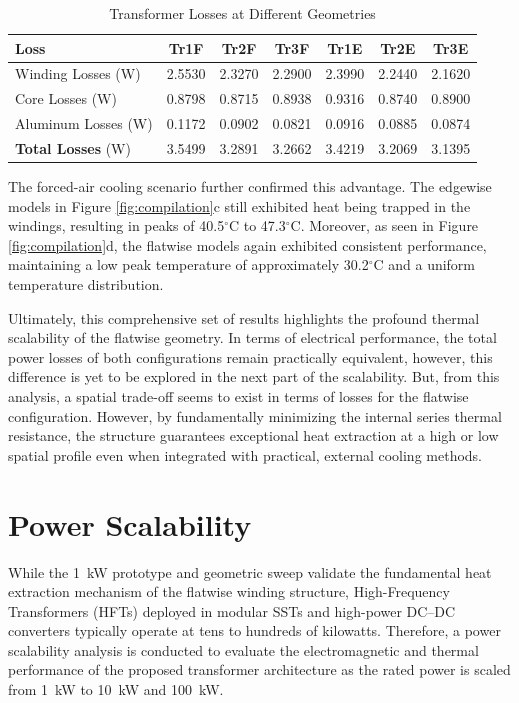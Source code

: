 \begin{table}[h!]
\centering
\caption{Transformer Losses at Different Geometries}
\label{tab:transformer_losses}
\begin{tabular}{lcccccc}
\hline
\hline
\textbf{Loss} & \textbf{Tr1F} & \textbf{Tr2F} & \textbf{Tr3F} & \textbf{Tr1E} & \textbf{Tr2E} & \textbf{Tr3E} \\
\hline
Winding Losses (W)  & 2.5530 & 2.3270 & 2.2900 & 2.3990 & 2.2440 & 2.1620 \\
Core Losses (W)     & 0.8798 & 0.8715 & 0.8938 & 0.9316 & 0.8740 & 0.8900 \\
Aluminum Losses (W) & 0.1172 & 0.0902 & 0.0821 & 0.0916 & 0.0885 & 0.0874 \\
\hline
\textbf{Total Losses} (W)    & 3.5499 & 3.2891 & 3.2662 & 3.4219 & 3.2069 & 3.1395 \\
\hline
\hline
\end{tabular} 
\end{table}

The forced-air cooling scenario further confirmed this advantage. The edgewise models in Figure \ref{fig:compilation}c still exhibited heat being trapped in the windings, resulting in peaks of 40.5$^\circ$C to 47.3$^\circ$C. Moreover, as seen in Figure \ref{fig:compilation}d, the flatwise models again exhibited consistent performance, maintaining a low peak temperature of approximately 30.2$^\circ$C and a uniform temperature distribution. 

Ultimately, this comprehensive set of results highlights the profound thermal scalability of the flatwise geometry. In terms of electrical performance, the total power losses of both configurations remain practically equivalent, however, this difference is yet to be explored in the next part of the scalability. But, from this analysis, a spatial trade-off seems to exist in terms of losses for the flatwise configuration. However, by fundamentally minimizing the internal series thermal resistance, the structure guarantees exceptional heat extraction at a high or low spatial profile even when integrated with practical, external cooling methods.

\section{Power Scalability}
While the 1~kW prototype and geometric sweep validate the fundamental heat extraction mechanism of the flatwise winding structure, High-Frequency Transformers (HFTs) deployed in modular SSTs and high-power DC--DC converters typically operate at tens to hundreds of kilowatts. Therefore, a power scalability analysis is conducted to evaluate the electromagnetic and thermal performance of the proposed transformer architecture as the rated power is scaled from 1~kW to 10~kW and 100~kW.


